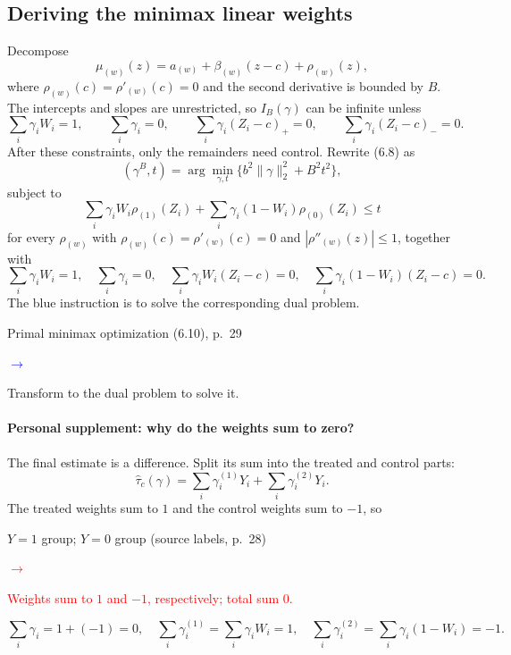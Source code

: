 \documentclass[11pt,a4paper]{article}
\newcommand{\inkred}[1]{\textcolor{red}{#1}}
\newenvironment{inkblock}[1]{\par\begingroup\color{#1}}{\par\endgroup}
\newcommand{\notearrow}[3]{%
\par\Needspace{6\baselineskip}\smallskip
\noindent\begin{minipage}[c]{0.43\linewidth}\raggedright\color{#1}#2\end{minipage}%
\hfill\textcolor{#1}{\(\longrightarrow\)}\hfill%
\begin{minipage}[c]{0.43\linewidth}\raggedright#3\end{minipage}\par\smallskip}
\begin{document}
\subsection{Deriving the minimax linear weights}
Decompose
\[
\mu_{(w)}(z)=a_{(w)}+\beta_{(w)}(z-c)+\rho_{(w)}(z),
\]
where $\rho_{(w)}(c)=\rho'_{(w)}(c)=0$ and the second derivative is bounded by $B$. The intercepts and slopes are unrestricted, so $I_B(\gamma)$ can be infinite unless
\[
\sum_i\gamma_iW_i=1,\qquad \sum_i\gamma_i=0,\qquad
\sum_i\gamma_i(Z_i-c)_+=0,\qquad \sum_i\gamma_i(Z_i-c)_-=0.
\]
After these constraints, only the remainders need control. Rewrite (6.8) as
\[
(\gamma^B,t)=\arg\min_{\gamma,t}\{b^2\|\gamma\|_2^2+B^2t^2\},
\]
subject to
\[
\sum_i\gamma_iW_i\rho_{(1)}(Z_i)+\sum_i\gamma_i(1-W_i)\rho_{(0)}(Z_i)\leq t
\]
for every $\rho_{(w)}$ with $\rho_{(w)}(c)=\rho'_{(w)}(c)=0$ and $|\rho''_{(w)}(z)|\leq1$, together with
\[
\sum_i\gamma_iW_i=1,\quad\sum_i\gamma_i=0,\quad
\sum_i\gamma_iW_i(Z_i-c)=0,\quad
\sum_i\gamma_i(1-W_i)(Z_i-c)=0.
\tag{6.10 in the notes}
\]
The blue instruction is to solve the corresponding dual problem.
\notearrow{blue}{Primal minimax optimization (6.10), p.~29}{Transform to the dual problem to solve it.}

\paragraph{Personal supplement: why do the weights sum to zero?}
The final estimate is a difference. Split its sum into the treated and control parts:
\[
\widehat\tau_c(\gamma)=\sum_i\gamma_i^{(1)}Y_i+\sum_i\gamma_i^{(2)}Y_i.
\]
The treated weights sum to $1$ and the control weights sum to $-1$, so
\notearrow{red}{$Y=1$ group; $Y=0$ group (source labels, p.~28)}{\inkred{Weights sum to $1$ and $-1$, respectively; total sum $0$.}}

\begin{inkblock}{red}
\[
\sum_i\gamma_i=1+(-1)=0,\quad
\sum_i\gamma_i^{(1)}=\sum_i\gamma_iW_i=1,\quad
\sum_i\gamma_i^{(2)}=\sum_i\gamma_i(1-W_i)=-1.
\]
\end{inkblock}
\end{document}
